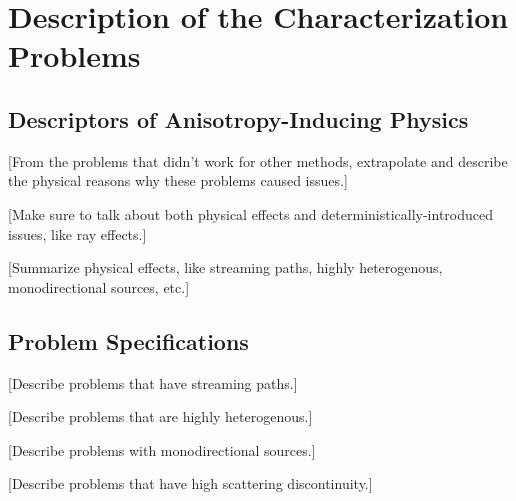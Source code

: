 \section{Description of the Characterization Problems}
\label{sec:AngleProbDesc}

\subsection{Descriptors of Anisotropy-Inducing Physics}
\label{subsec:AngleProbDescriptors}

[From the problems that didn't work for other methods, extrapolate and describe
the physical reasons why these problems caused issues.]

[Make sure to talk about both physical effects and deterministically-introduced
issues, like ray effects.]

[Summarize physical effects, like streaming paths, highly heterogenous,
monodirectional sources, etc.]

\subsection{Problem Specifications}
\label{subsec:ProbSpecs}

[Describe problems that have streaming paths.]

[Describe problems that are highly heterogenous.]

[Describe problems with monodirectional sources.]

[Describe problems that have high scattering discontinuity.]
